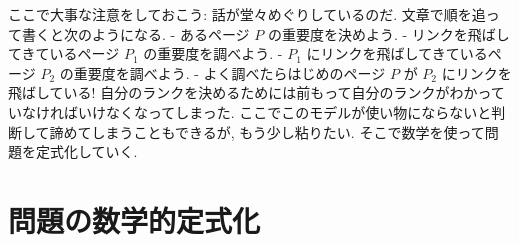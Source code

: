\documentclass[openany, a4paper, oneside]{jsbook}
\begin{document}
\begin{rem}
ここで大事な注意をしておこう: 話が堂々めぐりしているのだ.
文章で順を追って書くと次のようになる.
- あるページ $P$ の重要度を決めよう.
- リンクを飛ばしてきているページ $P_1$ の重要度を調べよう.
- $P_1$ にリンクを飛ばしてきているページ $P_2$ の重要度を調べよう.
- よく調べたらはじめのページ $P$ が $P_2$ にリンクを飛ばしている!
自分のランクを決めるためには前もって自分のランクがわかっていなければいけなくなってしまった.
ここでこのモデルが使い物にならないと判断して諦めてしまうこともできるが, もう少し粘りたい.
そこで数学を使って問題を定式化していく.
\end{rem}
\section{問題の数学的定式化}
\end{document}
